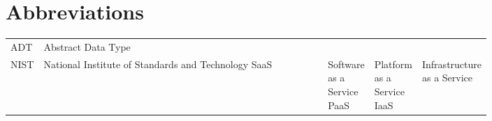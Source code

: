 \chapter*{Abbreviations}

\begin{flushleft}
\begin{tabular}{l p{0.8\linewidth}}
ADT      & Abstract Data Type\\
NIST	 & National Institute of Standards and Technology
SaaS 	 & Software as a Service
PaaS	 & Platform as a Service
IaaS 	 & Infrastructure as a Service
\end{tabular}
\end{flushleft}

